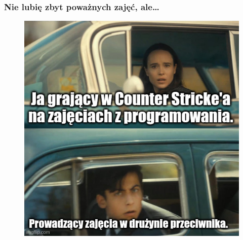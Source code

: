 \documentclass[10pt,t]{beamer}
\begin{document}
\begin{frame}
  \frametitle{Nie lubię zbyt poważnych zajęć, ale\ldots}

  \vspace{-0.5em}


  \begin{figure}

    \label{fig:Jak-to-bywa-na-zajeciach}

    \centering


    \includegraphics[scale=0.42]
    {./Presentations-pictures/Miscancellous-pictures/Jak-to-bywa-na-zajeciach.jpeg}

  \end{figure}

\end{frame}
\end{document}
